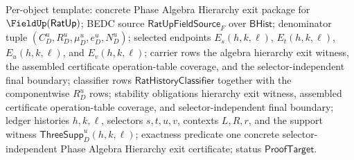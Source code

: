 Per-object template: concrete Phase Algebra Hierarchy exit package for
$\FieldUp(\mathsf{RatUp})$; BEDC source $\mathsf{RatUpFieldSource}_F$ over
$\mathsf{BHist}$; denominator tuple
$(C_D^u,R_D^u,\mu_D^u,e_D^u,N_D^u)$; selected endpoints $E_s(h,k,\ell)$,
$E_t(h,k,\ell)$, $E_u(h,k,\ell)$, and $E_v(h,k,\ell)$; carrier rows the algebra
hierarchy exit witness, the assembled certificate operation-table coverage, and
the selector-independent final boundary; classifier rows
$\mathsf{RatHistoryClassifier}$ together with the componentwise $R_D^u$ rows;
stability obligations hierarchy exit witness, assembled certificate
operation-table coverage, and selector-independent final boundary; ledger
histories $h,k,\ell$, selectors $s,t,u,v$, contexts $L,R,r$, and the support
witness $\mathsf{ThreeSupp}_D^u(h,k,\ell)$; exactness predicate one concrete
selector-independent Phase Algebra Hierarchy exit certificate; status
$\mathsf{ProofTarget}$.

